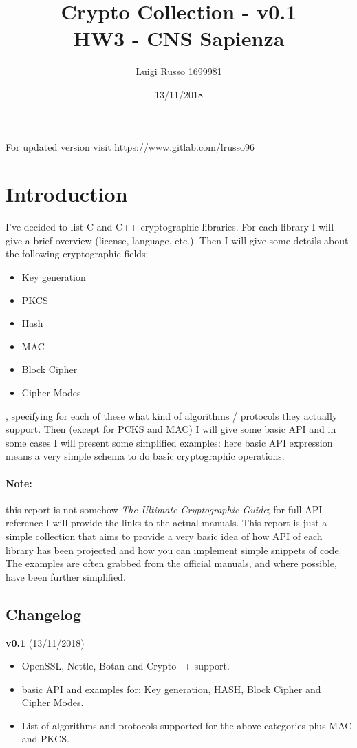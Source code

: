 \documentclass[11 pt]{article}
\title{
	Crypto Collection - v0.1 \\
	\large HW3 - CNS Sapienza}
\author{Luigi Russo 1699981}
\date{13/11/2018}
\begin{document}
\maketitle

For updated version visit https://www.gitlab.com/lrusso96
\section{Introduction}
I've decided to list C and C++ cryptographic libraries. For each library I will give a brief overview (license, language, etc.). Then I will give some details about the following cryptographic fields:
\begin{itemize}
	\item Key generation
	\item PKCS
	\item Hash
	\item MAC
	\item Block Cipher
	\item Cipher Modes
\end{itemize}, specifying for each of these what kind of algorithms / protocols they actually support. Then (except for PCKS and MAC) I will give some basic API and in some cases I will present some simplified examples: here basic API expression means a very simple schema to do basic cryptographic operations.
\paragraph*{Note:} this report is not somehow \textit{The Ultimate Cryptographic Guide}; for full API reference I will provide the links to the actual manuals. This report is just a simple collection that aims to provide a very basic idea of how API of each library has been projected and how you can implement simple snippets of code. The examples are often grabbed from the official manuals, and where possible, have been further simplified.

\subsection{Changelog}
\textbf{v0.1} (13/11/2018)
\begin{itemize}
	\item OpenSSL, Nettle, Botan and Crypto++ support.
	\item basic API and examples for: Key generation, HASH, Block Cipher and Cipher Modes.
	\item List of algorithms and protocols supported for the above categories plus MAC and PKCS.
\end{itemize}
 
\end{document}
